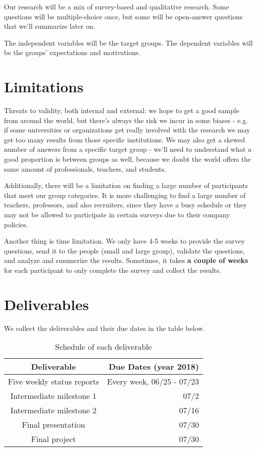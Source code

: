 \documentclass{sigchi}
\begin{document}
 Our research will be a mix of survey-based and qualitative research. Some questions will be multiple-choice once, but some will be open-answer questions that we'll summarize later on.
 
 The independent variables will be the target groups. The dependent variables will be the groups' expectations and motivations.
 
  \section{Limitations}
 Threats to validity, both internal and external: we hope to get a good sample from around the world, but there's always the risk we incur in some biases - e.g. if some universities or organizations get really involved with the research we may get too many results from those specific institutions. We may also get a skewed number of answers from a specific target group - we'll need to understand what a good proportion is between groups as well, because we doubt the world offers the same amount of professionals, teachers, and students.
 
Additionally, there will be a limitation on finding a large number of participants that meet our group categories. It is more challenging to find a large number of teachers, professors, and also recruiters, since they have a busy schedule or they may not be allowed to participate in certain surveys due to their company policies. 
  
 Another thing is time limitation. We only have 4-5 weeks to provide the survey questions, send it to the people (small and large group), validate the questions, and analyze and summerize the results. Sometimes, it takes \textbf{a couple of weeks} for each participant to only complete the survey and collect the results.
 
  
 \section{Deliverables}
 We collect the deliverables and their due dates in the table below.
 
 \begin{table}[H]
 \centering
 \begin{tabular}{c r} 					%
 \hline\hline						%
 Deliverable & Due Dates (year 2018)\\
 \hline
 Five weekly status reports & Every week, 06/25 - 07/23\\
 Intermediate milestone 1 & 07/2\\
 Intermediate milestone 2 & 07/16\\
 Final presentation & 07/30\\
 Final project & 07/30\\
 \hline
 \end{tabular}
 \caption{Schedule of each deliverable} 	%
 \end{table}
	  
\end{document}
